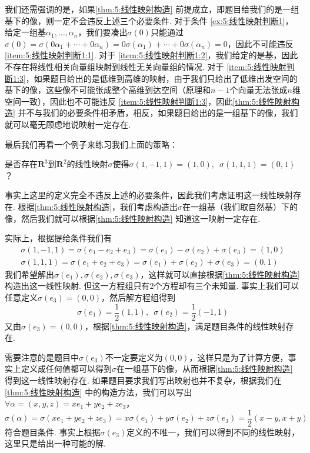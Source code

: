 我们还需强调的是，如果\autoref{thm:5:线性映射构造} 前提成立，即题目给我们的是一组基下的像，则一定不会违反上述三个必要条件. 对于条件 \ref*{ex:5:线性映射判断1}，给定一组基$\alpha_1,\ldots,\alpha_n$，我们要凑出$\sigma(0)$只能通过$\sigma(0)=\sigma(0\alpha_1+\cdots+0\alpha_n)=0\sigma(\alpha_1)+\cdots+0\sigma(\alpha_n)=0$，因此不可能违反  \ref*{item:5:线性映射判断1:1}. 对于 \ref*{item:5:线性映射判断1:2}，我们给定的是基，因此不存在将线性相关向量组映射到线性无关向量组的情况. 对于 \ref*{item:5:线性映射判断1:3}，如果题目给出的是低维到高维的映射，由于我们只给出了低维出发空间的基下的像，这些像不可能张成整个高维到达空间（原理和$n-1$个向量无法张成$n$维空间一致），因此也不可能违反 \ref*{item:5:线性映射判断1:3}，因此\autoref{thm:5:线性映射构造} 并不与我们的必要条件相矛盾，相反，如果题目给出的是一组基下的像，我们就可以毫无顾虑地说映射一定存在.

最后我们再看一个例子来练习我们上面的策略：
\begin{example}\label{ex:5:线性映射判断2}
    是否存在$\mathbf{R}^3$到$\mathbf{R}^2$的线性映射$\sigma$使得$\sigma(1,-1,1)=(1,0),\enspace\sigma(1,1,1)=(0,1)$？
\end{example}

\begin{solution}
    事实上这里的定义完全不违反上述的必要条件，因此我们考虑证明这一线性映射存在. 根据\autoref{thm:5:线性映射构造}，我们考虑构造出$\sigma$在一组基（我们取自然基）下的像，然后我们就可以根据\autoref*{thm:5:线性映射构造} 知道这一映射一定存在.

    实际上，根据提给条件我们有
    \begin{gather*}
        \sigma(1,-1,1)=\sigma(e_1-e_2+e_3)=\sigma(e_1)-\sigma(e_2)+\sigma(e_3)=(1,0) \\
        \sigma(1,1,1)=\sigma(e_1+e_2+e_3)=\sigma(e_1)+\sigma(e_2)+\sigma(e_3)=(0,1)
    \end{gather*}
    我们希望解出$\sigma(e_1),\sigma(e_2),\sigma(e_3)$，这样就可以直接根据\autoref*{thm:5:线性映射构造} 构造出这一线性映射. 但这一方程组只有2个方程却有三个未知量. 事实上我们可以任意定义$\sigma(e_3)=(0,0)$，然后解方程组得到
    \[\sigma(e_1)=\dfrac{1}{2} (1,1),\enspace \sigma(e_2)=\dfrac{1}{2} (-1,1)\]
    又由$\sigma(e_3)=(0,0)$，根据\autoref*{thm:5:线性映射构造}，满足题目条件的线性映射存在.
\end{solution}
需要注意的是题目中$\sigma(e_3)$不一定要定义为$(0,0)$，这样只是为了计算方便，事实上定义成任何值都可以得到$\sigma$在一组基下的像，从而根据\autoref*{thm:5:线性映射构造} 得到这一线性映射存在. 如果题目要求我们写出映射也并不复杂，根据我们在\autoref*{thm:5:线性映射构造} 中的构造方法，我们可以写出$\forall\alpha=(x,y,z)=xe_1+ye_2+ze_3$，
\[\sigma(\alpha)=\sigma(xe_1+ye_2+ze_3)=x\sigma(e_1)+y\sigma(e_2)+z\sigma(e_3)=\dfrac{1}{2} (x-y,x+y)\]
符合题目条件. 事实上根据$\sigma(e_3)$定义的不唯一，我们可以得到不同的线性映射，这里只是给出一种可能的解.

